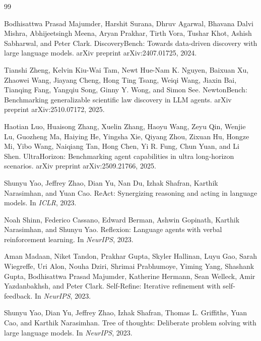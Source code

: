 \documentclass[letterpaper]{article}
\begin{document}
\begin{thebibliography}{99}

Bodhisattwa Prasad Majumder, Harshit Surana, Dhruv Agarwal, Bhavana
Dalvi Mishra, Abhijeetsingh Meena, Aryan Prakhar, Tirth Vora, Tushar
Khot, Ashish Sabharwal, and Peter Clark.
\newblock DiscoveryBench: Towards data-driven discovery with large language
models.
\newblock arXiv preprint arXiv:2407.01725, 2024.

Tianshi Zheng, Kelvin Kiu-Wai Tam, Newt Hue-Nam K. Nguyen, Baixuan Xu,
Zhaowei Wang, Jiayang Cheng, Hong Ting Tsang, Weiqi Wang, Jiaxin Bai,
Tianqing Fang, Yangqiu Song, Ginny Y. Wong, and Simon See.
\newblock NewtonBench: Benchmarking generalizable scientific law discovery in
LLM agents.
\newblock arXiv preprint arXiv:2510.07172, 2025.

Haotian Luo, Huaisong Zhang, Xuelin Zhang, Haoyu Wang, Zeyu Qin, Wenjie
Lu, Guozheng Ma, Haiying He, Yingsha Xie, Qiyang Zhou, Zixuan Hu,
Hongze Mi, Yibo Wang, Naiqiang Tan, Hong Chen, Yi R. Fung, Chun Yuan,
and Li Shen.
\newblock UltraHorizon: Benchmarking agent capabilities in ultra long-horizon
scenarios.
\newblock arXiv preprint arXiv:2509.21766, 2025.

Shunyu Yao, Jeffrey Zhao, Dian Yu, Nan Du, Izhak Shafran, Karthik
Narasimhan, and Yuan Cao.
\newblock ReAct: Synergizing reasoning and acting in language models.
\newblock In \emph{ICLR}, 2023.

Noah Shinn, Federico Cassano, Edward Berman, Ashwin Gopinath, Karthik
Narasimhan, and Shunyu Yao.
\newblock Reflexion: Language agents with verbal reinforcement learning.
\newblock In \emph{NeurIPS}, 2023.

Aman Madaan, Niket Tandon, Prakhar Gupta, Skyler Hallinan, Luyu Gao,
Sarah Wiegreffe, Uri Alon, Nouha Dziri, Shrimai Prabhumoye, Yiming Yang,
Shashank Gupta, Bodhisattwa Prasad Majumder, Katherine Hermann, Sean
Welleck, Amir Yazdanbakhsh, and Peter Clark.
\newblock Self-Refine: Iterative refinement with self-feedback.
\newblock In \emph{NeurIPS}, 2023.

Shunyu Yao, Dian Yu, Jeffrey Zhao, Izhak Shafran, Thomas L. Griffiths,
Yuan Cao, and Karthik Narasimhan.
\newblock Tree of thoughts: Deliberate problem solving with large language
models.
\newblock In \emph{NeurIPS}, 2023.


\end{thebibliography}
\end{document}
